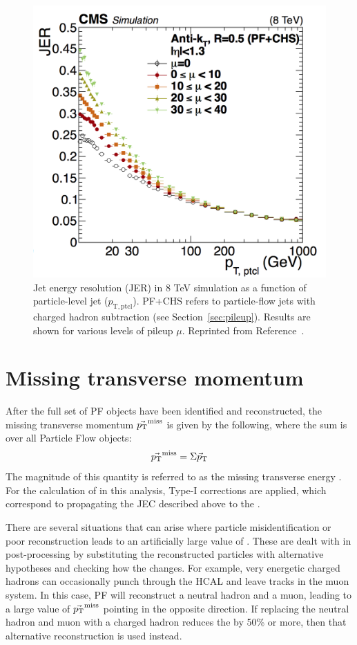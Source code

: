  \begin{figure}[h!]
	\centering
	\includegraphics[width=0.65\linewidth]{Figures/EventReconstruction/JER.png}
       \caption{Jet energy resolution (JER) in 8 TeV simulation as a function of particle-level jet \pt ($p_{\mathrm{T,ptcl}}$). PF+CHS refers to particle-flow
       jets with charged hadron subtraction (see Section~\ref{sec:pileup}). Results are shown for various levels of pileup $\mu$. 
       Reprinted from Reference~\cite{JEC}.}
       \label{fig:JER}
\end{figure}


\section{Missing transverse momentum}
\label{sec:MET_Reco}
After the full set of PF objects have been identified and reconstructed, the missing transverse momentum $\vec{p_{\mathrm{T}}}^{\mathrm{miss}}$ is given by the following, where the sum is over all Particle Flow objects:
\begin{equation}
\vec{p_{\mathrm{T}}}^{\mathrm{miss}} = \Sigma {\vec p}_{\mathrm{T}}
\end{equation}
The magnitude of this quantity is referred to as the missing transverse energy \ETmiss. For the calculation of \ETmiss in this analysis, Type-I corrections are applied, which correspond to propagating the JEC described above to the \ETmiss. 

There are several situations that can arise where particle misidentification or poor reconstruction leads to an artificially large value of \ETmiss. These are dealt with in post-processing by substituting the reconstructed particles with alternative hypotheses and checking how the \ETmiss changes. For example, very energetic charged hadrons can occasionally punch through the HCAL and leave tracks in the muon system. In this case, PF will reconstruct a neutral hadron and a muon, leading to a large value of $\vec{p_{\mathrm{T}}}^{\mathrm{miss}}$ pointing in the opposite direction. If replacing the neutral hadron and muon with a charged hadron reduces the \ETmiss by 50\% or more, then that alternative reconstruction is used instead.

